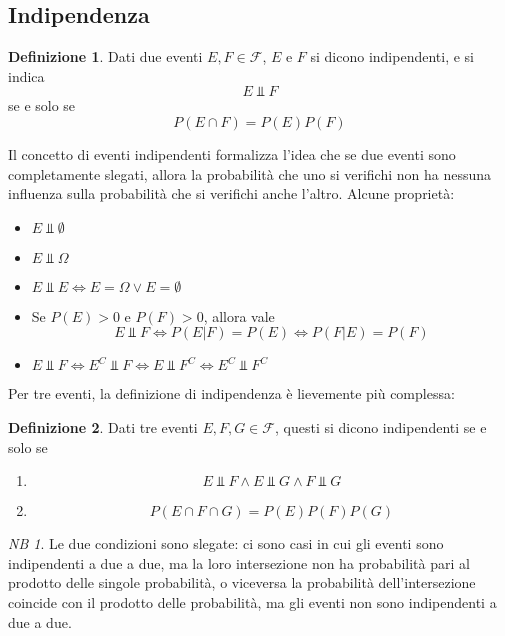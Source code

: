 \documentclass{article}
\theoremstyle{plain}
\theoremstyle{definition}
\newtheorem{definizione}{Definizione}[section]
\theoremstyle{remark}
\newtheorem*{NB}{NB}
\begin{document}
\subsection{Indipendenza} %
\label{sub:indipendenza}
\begin{definizione}
	Dati due eventi $E,F\in\mathscr{F}$, $E$ e $F$ si dicono indipendenti, e si indica
	\begin{equation*}
		E\Bot F
	\end{equation*}
	se e solo se
	\begin{equation*}
		P(E\cap F)=P(E)P(F)
	\end{equation*}
\end{definizione}
Il concetto di eventi indipendenti formalizza l'idea che se due eventi sono completamente slegati, allora la probabilità che uno si verifichi non ha nessuna influenza sulla probabilità che si verifichi anche l'altro. Alcune proprietà:
\begin{itemize}
	\item $E\Bot \emptyset$
	\item $E\Bot\Omega$
	\item $E\Bot E\Leftrightarrow E=\Omega\vee E=\emptyset$
	\item Se $P(E)>0$ e $P(F)>0$, allora vale
	\begin{equation*}
		E\Bot F\Leftrightarrow P(E|F)=P(E) \Leftrightarrow P(F|E)=P(F)
	\end{equation*}
	\item $E\Bot F\Leftrightarrow E^C\Bot F\Leftrightarrow E\Bot F^C\Leftrightarrow E^C\Bot F^C$
\end{itemize}
Per tre eventi, la definizione di indipendenza è lievemente più complessa:
\begin{definizione}
	Dati tre eventi $E,F,G\in\mathscr{F}$, questi si dicono indipendenti se e solo se
	\begin{enumerate}
		\item
		\begin{equation*}
			E\Bot F\wedge E\Bot G\wedge F\Bot G
		\end{equation*}
		\item 
		\begin{equation*}
			P(E\cap F\cap G)=P(E)P(F)P(G)
		\end{equation*}
	\end{enumerate}
\end{definizione}
\begin{NB}
	Le due condizioni sono slegate: ci sono casi in cui gli eventi sono indipendenti a due a due, ma la loro intersezione non ha probabilità pari al prodotto delle singole probabilità, o viceversa la probabilità dell'intersezione coincide con il prodotto delle probabilità, ma gli eventi non sono indipendenti a due a due.
\end{NB}
\end{document}
